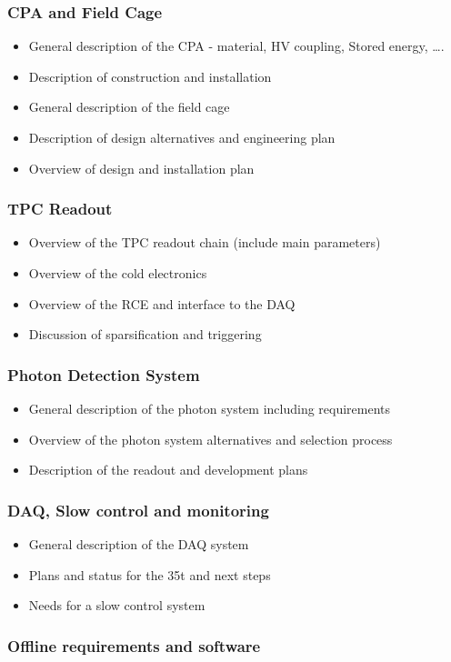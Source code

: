 \subsubsection{CPA and Field Cage}
\begin{itemize}
\item General description of the CPA - material, HV coupling, Stored energy, ….
\item Description of construction and installation
\item General description of the field cage
\item Description of design alternatives and engineering plan
\item Overview of design and installation plan
\end{itemize}

\subsubsection{TPC Readout}

\begin{itemize}
\item Overview of the TPC readout chain (include main parameters)
\item Overview of the cold electronics
\item Overview of the RCE and interface to the DAQ
\item	Discussion of sparsification and triggering
\end{itemize}

\subsubsection{Photon Detection System}
\begin{itemize}
\item General description of the photon system including requirements
\item Overview of the photon system alternatives and selection process
\item Description of the readout and development plans
\end{itemize}

\subsubsection{DAQ, Slow control and monitoring}

\begin{itemize}
\item General description of the DAQ system
\item Plans and status for the 35t and next steps
\item Needs for a slow control system
\end{itemize}

\subsubsection{Offline requirements and software}



